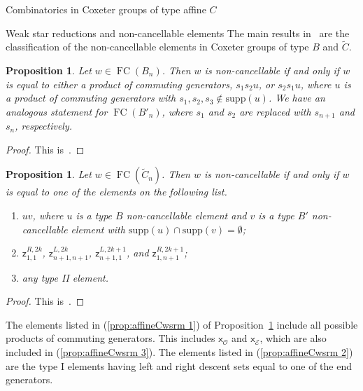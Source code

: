 \documentclass[11pt]{amsart}
\newtheorem{proposition}[theorem]{Proposition}
\theoremstyle{definition}
\numberwithin{equation}{section}
\newcommand{\C}{\widetilde{C}}
\renewcommand{\O}{\mathcal{O}}
\newcommand{\E}{\mathcal{E}}
\newcommand{\z}{\mathsf{z}}
\newcommand{\x}{\mathsf{x}}
\newcommand{\supp}{\mathrm{supp}}
\renewcommand{\(}{\left(}
\renewcommand{\)}{\right)}
\DeclareMathOperator{\FC}{FC}
\begin{document}
\begin{section}{Combinatorics in Coxeter groups of type affine $C$}
\begin{subsection}{Weak star reductions and non-cancellable elements}
The main results in~\cite{Ernst2010} are the classification of the non-cancellable elements in Coxeter groups of type $B$ and $\C$.

\begin{proposition}\label{prop:Bwsrm}
Let $w \in \FC(B_{n})$.  Then $w$ is non-cancellable if and only if $w$ is equal to either a product of commuting generators, $s_{1}s_{2}u$, or $s_{2}s_{1}u$, where $u$ is a product of commuting generators with $s_{1}, s_{2}, s_{3} \notin \supp(u)$.  We have an analogous statement for $\FC(B'_{n})$, where $s_{1}$ and $s_{2}$ are replaced with $s_{n+1}$ and $s_{n}$, respectively.
\end{proposition}

\begin{proof}
This is~\cite[Theorem 4.2.1]{Ernst2010}.
\end{proof}

\begin{proposition}\label{prop:affineCwsrm}
Let $w \in \FC(\C_{n})$.  Then $w$ is non-cancellable if and only if $w$ is equal to one of the elements on the following list.
\begin{enumerate}
\item \label{prop:affineCwsrm 1} $uv$, where $u$ is a type $B$ non-cancellable element and $v$ is a type $B'$ non-cancellable element with $\supp(u)\cap \supp(v)=\emptyset$;
\item \label{prop:affineCwsrm 2} $\z^{R,2k}_{1,1}$, $\z^{L,2k}_{n+1,n+1}$, $\z^{L,2k+1}_{n+1,1}$, and $\z^{R,2k+1}_{1,n+1}$; 
\item \label{prop:affineCwsrm 3} any type II element.
\end{enumerate}
\end{proposition}

\begin{proof}
This is~\cite[Theorem 5.1.1]{Ernst2010}.
\end{proof}

The elements listed in (\ref{prop:affineCwsrm 1}) of Proposition~\ref{prop:affineCwsrm} include all possible products of commuting generators.  This includes $\x_{\O}$ and $\x_{\E}$, which are also included in (\ref{prop:affineCwsrm 3}).  The elements listed in (\ref{prop:affineCwsrm 2}) are the type I elements having left and right descent sets equal to one of the end generators.

\end{subsection}



\end{section}
\end{document}
